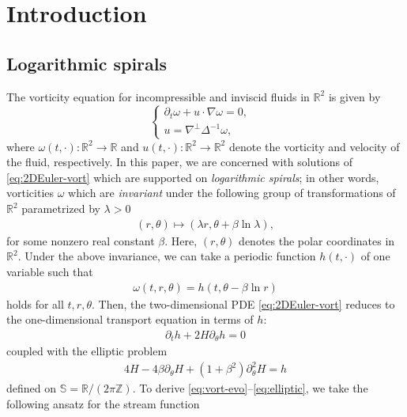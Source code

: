 \documentclass[10pt]{article}
\theoremstyle{definition}
\theoremstyle{remark}
\numberwithin{equation}{section}
\newcommand{\lap}{\Delta}
\newcommand{\rd}{\partial}
\newcommand{\nb}{\nabla}
\newcommand{\0}{\emptyset}
\newcommand{\bt}{\beta}
\newcommand{\lmb}{\lambda}
\newcommand{\tht}{\theta}
\newcommand{\omg}{\omega}
\newcommand{\bbR}{\mathbb R}
\newcommand{\bbS}{\mathbb S}
\newcommand{\bbZ}{\mathbb Z}
\begin{document}
	\section{Introduction} 
	
	\subsection{Logarithmic spirals}
	The vorticity equation for incompressible and inviscid fluids in $\bbR^2$ is given by  \begin{equation}\label{eq:2DEuler-vort}
		\left\{
		\begin{aligned}
			\rd_t\omg + u\cdot\nb \omg = 0, & \\
			u = \nb^\perp \lap^{-1}\omg , &
		\end{aligned}
		\right.
	\end{equation} where $\omg(t,\cdot):\bbR^2\to\bbR$ and $u(t,\cdot):\bbR^2\to\bbR^{2}$ denote the vorticity and velocity of the fluid, respectively. In this paper, we are concerned with solutions of \eqref{eq:2DEuler-vort} which are supported on \textit{logarithmic spirals}; in other words, vorticities $\omg$ which are \textit{invariant} under the following group of transformations of $\bbR^{2}$ parametrized by $\lmb>0$ \begin{equation*}
		\begin{split}
			(r,\tht) \mapsto (\lmb r, \tht + \beta\ln \lmb),
		\end{split}
	\end{equation*} for some nonzero real constant $\bt$. Here, $(r,\tht)$ denotes the polar coordinates in $\bbR^2$. Under the above invariance, we can take a periodic function $h(t,\cdot)$ of one variable such that 
	\begin{equation}\label{eq:vort-homog-spi}
		\begin{split}
			\omg(t,r,\tht) = h(t, \tht - \beta \ln r )
		\end{split}
	\end{equation} holds for all $t, r, \tht$. Then, the two-dimensional PDE \eqref{eq:2DEuler-vort} reduces to the  one-dimensional transport equation in terms of $h$: \begin{equation}\label{eq:vort-evo}
		\begin{split}
			\rd_t h + 2H \rd_\tht h = 0 
		\end{split}
	\end{equation} coupled with the elliptic problem \begin{equation}\label{eq:elliptic}
		\begin{split}
			4H-4\beta \partial_{\theta} H + (1+\beta^2)\partial^2_{\theta} H = h
		\end{split}
	\end{equation} defined on $\bbS = \bbR/(2\pi\bbZ)$. To derive \eqref{eq:vort-evo}--\eqref{eq:elliptic}, we take the following ansatz for the stream function 
\end{document}
